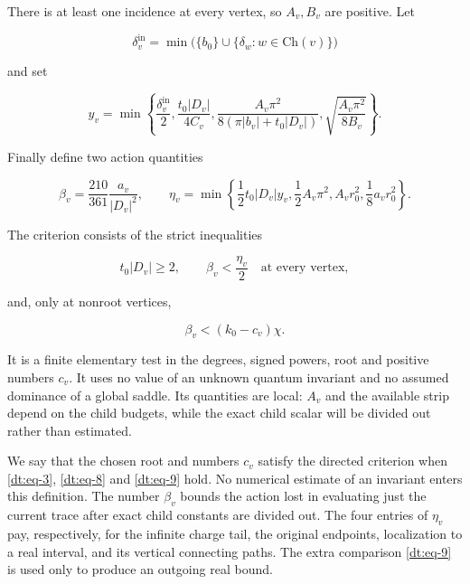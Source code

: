 There is at least one incidence at every vertex, so \(A_v,B_v\) are positive.
Let

\begin{equation}\label{dt:eq-5}
\delta_v^{\mathrm{in}}
      =\min\bigl(\{b_0\}\cup
                     \{\delta_w:w\in\mathrm{Ch}(v)\}\bigr)
\end{equation}

and set

\begin{equation}\label{dt:eq-6}
y_v=\min\left\{
 \frac{\delta_v^{\mathrm{in}}}2,
 \frac{t_0|D_v|}{4C_v},
 \frac{A_v\pi^2}{8(\pi|b_v|+t_0|D_v|)},
 \sqrt{\frac{A_v\pi^2}{8B_v}}
 \right\}.
\end{equation}

Finally define two action quantities

\begin{equation}\label{dt:eq-7}
\beta_v=\frac{210}{361}\frac{a_v}{|D_v|^2},
 \qquad
 \eta_v=\min\left\{
 \frac12t_0|D_v|y_v,
 \frac12A_v\pi^2,
 A_vr_0^2,
 \frac18a_vr_0^2
 \right\}.
\end{equation}

The criterion consists of the strict inequalities

\begin{equation}\label{dt:eq-8}
\boxed{\quad t_0|D_v|\ge2,\qquad
                 \beta_v<\frac{\eta_v}{2}\quad
                      \text{at every vertex},\quad}
\end{equation}

and, only at nonroot vertices,

\begin{equation}\label{dt:eq-9}
\boxed{\qquad
       \beta_v<(k_0-c_v)\chi.\qquad}
\end{equation}

It is a finite elementary test in the degrees, signed powers, root and
positive numbers \(c_v\). It uses no value of an unknown quantum invariant
and no assumed dominance of a global saddle. Its quantities are local:
\(A_v\) and the available strip depend on the child budgets, while the exact
child scalar will be divided out rather than estimated.


We say that the chosen root and numbers \(c_v\) satisfy the directed
criterion when \eqref{dt:eq-3}, \eqref{dt:eq-8} and \eqref{dt:eq-9} hold.
No numerical estimate of an invariant enters this definition.
The number \(\beta_v\) bounds the action lost in evaluating just the
current trace after exact child constants are divided out. The four
entries of \(\eta_v\) pay, respectively, for the infinite charge tail,
the original endpoints, localization to a real interval, and its
vertical connecting paths. The extra comparison \eqref{dt:eq-9} is used
only to produce an outgoing real bound.
